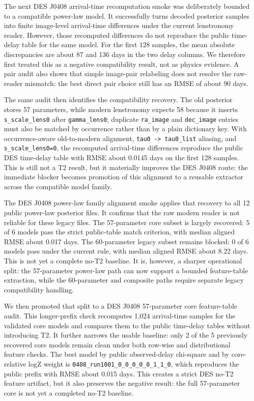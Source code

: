 \documentclass[11pt]{article}
\begin{document}
The next DES J0408 arrival-time recomputation smoke was deliberately bounded to
a compatible power-law model.  It successfully turns decoded posterior samples
into finite image-level arrival-time differences under the current lenstronomy
reader.  However, those recomputed differences do not reproduce the public
time-delay table for the same model.  For the first 128 samples, the mean
absolute discrepancies are about 87 and 136 days in the two delay columns.  We
therefore first treated this as a negative compatibility result, not as physics
evidence.  A pair audit also shows that simple image-pair relabeling does not
resolve the raw-reader mismatch: the best direct pair choice still has an RMSE
of about 90 days.

The same audit then identifies the compatibility recovery.  The old posterior
stores 57 parameters, while modern lenstronomy expects 58 because it inserts
\texttt{s\_scale\_lens0} after \texttt{gamma\_lens0}; duplicate
\texttt{ra\_image} and \texttt{dec\_image} entries must also be matched by
occurrence rather than by a plain dictionary key.  With occurrence-aware
old-to-modern alignment, \texttt{tau0 -> tau0\_list} aliasing, and
\texttt{s\_scale\_lens0=0}, the recomputed arrival-time differences reproduce
the public DES time-delay table with RMSE about 0.0145 days on the first 128
samples.  This is still not a T2 result, but it materially improves the DES
J0408 route: the immediate blocker becomes promotion of this alignment to a
reusable extractor across the compatible model family.

The DES J0408 power-law family alignment smoke applies that recovery to all 12
public power-law posterior files.  It confirms that the raw modern reader is
not reliable for these legacy files.  The 57-parameter core subset is largely
recovered: 5 of 6 models pass the strict public-table match criterion, with
median aligned RMSE about 0.017 days.  The 60-parameter legacy subset remains
blocked: 0 of 6 models pass under the current rule, with median aligned RMSE
about 8.22 days.  This is not yet a complete no-T2 baseline.  It is, however,
a sharper operational split: the 57-parameter power-law path can now support a
bounded feature-table extraction, while the 60-parameter and composite paths
require separate legacy compatibility handling.

We then promoted that split to a DES J0408 57-parameter core feature-table
audit.  This longer-prefix check recomputes 1,024 arrival-time samples for the
validated core models and compares them to the public time-delay tables without
introducing T2.  It further narrows the usable baseline: only 2 of the 5
previously recovered core models remain clean under both row-wise and
distributional feature checks.  The best model by public observed-delay
chi-square and by core-relative logZ weight is
\texttt{0408\_run1001\_0\_0\_0\_0\_0\_1\_1\_0}, which reproduces the public
prefix with RMSE about 0.015 days.  This creates a strict DES no-T2 feature
artifact, but it also preserves the negative result: the full 57-parameter
core is not yet a completed no-T2 baseline.
\end{document}

